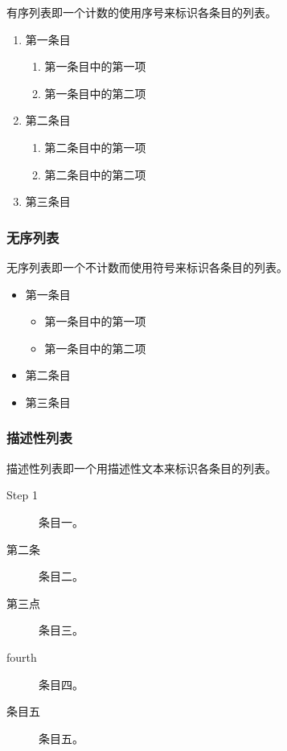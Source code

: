 有序列表即一个计数的使用序号来标识各条目的列表。
  \begin{enumerate}
      \item 第一条目
          \begin{enumerate}
              \item 第一条目中的第一项
              \item 第一条目中的第二项
          \end{enumerate}
      \item 第二条目
    \begin{enumerate}[label=(\roman*)]
      \item 第二条目中的第一项
      \item 第二条目中的第二项
    \end{enumerate}
      \item 第三条目
  \end{enumerate}

\subsubsection{无序列表}
  无序列表即一个不计数而使用符号来标识各条目的列表。
  \begin{itemize}
      \item 第一条目
      \begin{itemize}
          \item 第一条目中的第一项
          \item 第一条目中的第二项
      \end{itemize}
      \item 第二条目
      \item 第三条目
  \end{itemize}

\subsubsection{描述性列表}

描述性列表即一个用描述性文本来标识各条目的列表。

\begin{description}
  \item[Step 1]  条目一。
  \item[第二条]  条目二。
  \item[第三点]  条目三。
  \item[fourth]  条目四。
  \item[条目五]  条目五。
\end{description}

